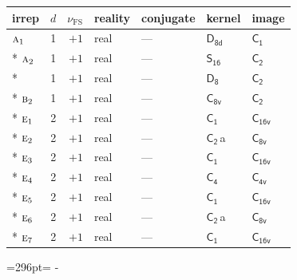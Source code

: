 \documentclass[10pt,a4paper]{article}
\newcommand{\needspace}[1]{\par\penalty-100\begingroup\dimen0=#1\relax\dimen2=\pagegoal
  \advance\dimen2-\pagetotal\ifdim\dimen0>\dimen2\relax\ifdim\dimen2>0pt\vfil\break\fi\fi
  \endgroup}
\numberwithin{equation}{section}
\newcommand{\grp}[1]{\mathsf{#1}}
\newcommand{\irr}[1]{\text{\normalfont\scshape #1}}
\newcommand{\detbox}[1]{{\setlength{\fboxsep}{1pt}\fbox{#1}}}
\newcommand{\clsletter}[1]{\,{\scriptsize\color{black!55}#1}}
\newcommand{\fsind}{\nu_{\mathrm{FS}}}
\begin{document}
{\small\renewcommand{\arraystretch}{1.25}\begin{longtable}{@{}lrrllll@{}}\toprule
irrep & $d$ & $\fsind$ & reality & conjugate & kernel & image\\\midrule\endhead
\bottomrule\endfoot\endlastfoot
$\irr{a}_{1}$ & 1 & $+1$ & real & --- & \href{D8d.pdf}{$\grp{D_{8d}}$} & \href{C1.pdf}{$\grp{C_{1}}$}\\*
$\irr{a}_{2}$ & 1 & $+1$ & real & --- & \href{S16.pdf}{$\grp{S_{16}}$} & \href{C2.pdf}{$\grp{C_{2}}$}\\*
\detbox{$\irr{b}_{1}$} & 1 & $+1$ & real & --- & \href{D8.pdf}{$\grp{D_{8}}$} & \href{C2.pdf}{$\grp{C_{2}}$}\\*
$\irr{b}_{2}$ & 1 & $+1$ & real & --- & \href{C8v.pdf}{$\grp{C_{8v}}$} & \href{C2.pdf}{$\grp{C_{2}}$}\\*
$\irr{e}_{1}$ & 2 & $+1$ & real & --- & \href{C1.pdf}{$\grp{C_{1}}$} & $\grp{C_{16v}}$\\*
$\irr{e}_{2}$ & 2 & $+1$ & real & --- & \href{C2.pdf}{$\grp{C_{2}}$}\clsletter{a} & \href{C8v.pdf}{$\grp{C_{8v}}$}\\*
$\irr{e}_{3}$ & 2 & $+1$ & real & --- & \href{C1.pdf}{$\grp{C_{1}}$} & $\grp{C_{16v}}$\\*
$\irr{e}_{4}$ & 2 & $+1$ & real & --- & \href{C4.pdf}{$\grp{C_{4}}$} & \href{C4v.pdf}{$\grp{C_{4v}}$}\\*
$\irr{e}_{5}$ & 2 & $+1$ & real & --- & \href{C1.pdf}{$\grp{C_{1}}$} & $\grp{C_{16v}}$\\*
$\irr{e}_{6}$ & 2 & $+1$ & real & --- & \href{C2.pdf}{$\grp{C_{2}}$}\clsletter{a} & \href{C8v.pdf}{$\grp{C_{8v}}$}\\*
$\irr{e}_{7}$ & 2 & $+1$ & real & --- & \href{C1.pdf}{$\grp{C_{1}}$} & $\grp{C_{16v}}$\\
\bottomrule\end{longtable}}
\needspace{296pt}
\end{document}
